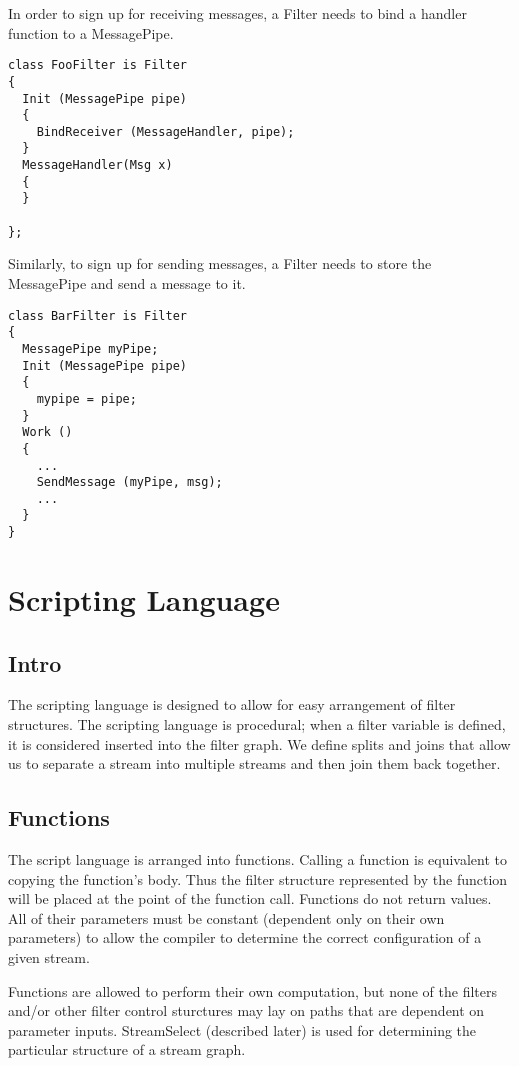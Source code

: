 \documentclass[twocolumn, draft]{article}
\begin{document}
In order to sign up for receiving messages, a Filter needs to bind a
handler function to a MessagePipe.

\begin{verbatim}
class FooFilter is Filter
{
  Init (MessagePipe pipe)
  {
    BindReceiver (MessageHandler, pipe);
  }
  MessageHandler(Msg x)
  {
  }

};
\end{verbatim}

Similarly, to sign up for sending messages, a Filter needs to store the
MessagePipe and send a message to it.

\begin{verbatim}
class BarFilter is Filter
{
  MessagePipe myPipe;
  Init (MessagePipe pipe)
  {
    mypipe = pipe;
  }
  Work ()
  {
    ...
    SendMessage (myPipe, msg);
    ...
  }
}
\end{verbatim}

\section{Scripting Language}

\subsection{Intro}

The scripting language is designed to allow for easy arrangement of 
filter structures.  The scripting language is procedural;  when a filter
variable is defined, it is considered inserted into the filter graph.
We define splits and joins that allow us to separate a stream into multiple
streams and then join them back together.

\subsection{Functions}

The script language is arranged into functions.  Calling a function is
equivalent to copying the function's body.  Thus the filter structure 
represented by the function will be placed at the point of the function
call.  Functions do not return values.  All of their parameters must
be constant (dependent only on their own parameters) to allow the compiler 
to determine the correct configuration of a given stream.

Functions are allowed to perform their own computation, but none of the
filters and/or other filter control sturctures may lay on paths that are
dependent on parameter inputs.  StreamSelect (described later) is used
for determining the particular structure of a stream graph.
\end{document}
